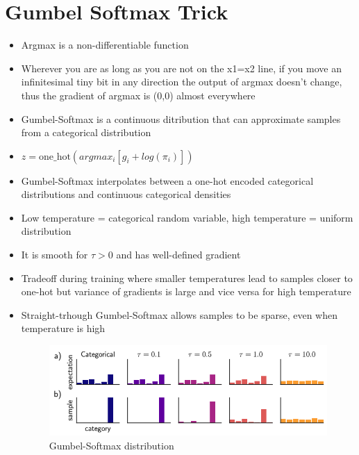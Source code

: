 \documentclass[../main.tex]{subfiles}
\begin{document}
\section{Gumbel Softmax Trick}
  \begin{itemize}
    \item Argmax is a non-differentiable function
    \item Wherever you are as long as you are not on the x1=x2 line, if you move an infinitesimal tiny bit in any direction the output of argmax doesn't change, thus the gradient of argmax is (0,0) almost everywhere
    \item Gumbel-Softmax is a continuous ditribution that can approximate samples from a categorical distribution
    \item $z = \text{one\_hot}(argmax_{i}[g_{i} + log(\pi_{i})])$
    \item Gumbel-Softmax interpolates between a one-hot encoded categorical distributions and continuous categorical densities
    \item Low temperature = categorical random variable, high temperature = uniform distribution
    \item It is smooth for $\tau > 0$ and has well-defined gradient
    \item Tradeoff during training where smaller temperatures lead to samples closer to one-hot but variance of gradients is large and vice versa for high temperature
    \item Straight-trhough Gumbel-Softmax allows samples to be sparse, even when temperature is high
    \begin{figure}[h]
      \caption{Gumbel-Softmax distribution}
      \centering
      \includegraphics[width=\textwidth]{../imgs/gumbel_softmax.png}
    \end{figure}
  \end{itemize}
\end{document}
